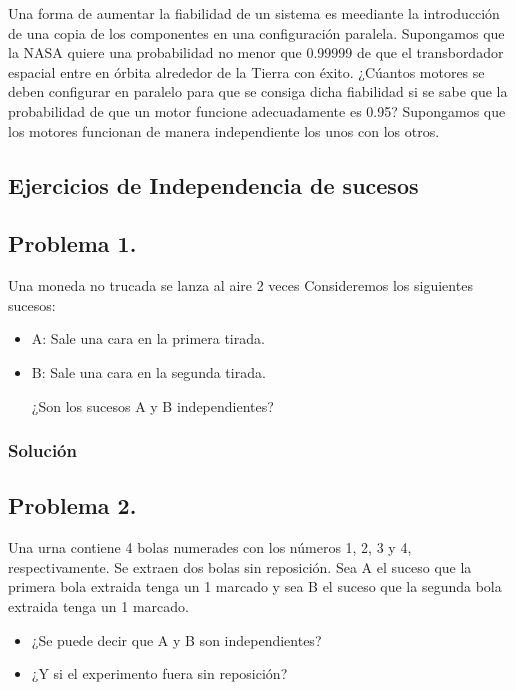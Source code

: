 \documentclass[
]{article}
\providecommand{\tightlist}{%
  \setlength{\itemsep}{0pt}\setlength{\parskip}{0pt}}
\begin{document}
Una forma de aumentar la fiabilidad de un sistema es meediante la
introducción de una copia de los componentes en una configuración
paralela. Supongamos que la NASA quiere una probabilidad no menor que
0.99999 de que el transbordador espacial entre en órbita alrededor de la
Tierra con éxito. ¿Cúantos motores se deben configurar en paralelo para
que se consiga dicha fiabilidad si se sabe que la probabilidad de que un
motor funcione adecuadamente es 0.95? Supongamos que los motores
funcionan de manera independiente los unos con los otros.

\hypertarget{ejercicios-de-independencia-de-sucesos}{%
\subsection{Ejercicios de Independencia de
sucesos}\label{ejercicios-de-independencia-de-sucesos}}

\hypertarget{problema-1.}{%
\subsection{Problema 1.}\label{problema-1.}}

Una moneda no trucada se lanza al aire 2 veces Consideremos los
siguientes sucesos:

\begin{itemize}
\item
  A: Sale una cara en la primera tirada.
\item
  B: Sale una cara en la segunda tirada.

  ¿Son los sucesos A y B independientes?
\end{itemize}

\hypertarget{soluciuxf3n-16}{%
\subsubsection{Solución}\label{soluciuxf3n-16}}

\hypertarget{problema-2.}{%
\subsection{Problema 2.}\label{problema-2.}}

Una urna contiene 4 bolas numerades con los números 1, 2, 3 y 4,
respectivamente. Se extraen dos bolas sin reposición. Sea A el suceso
que la primera bola extraida tenga un 1 marcado y sea B el suceso que la
segunda bola extraida tenga un 1 marcado.

\begin{itemize}
\tightlist
\item
  ¿Se puede decir que A y B son independientes?
\item
  ¿Y si el experimento fuera sin reposición?
\end{itemize}
\end{document}
